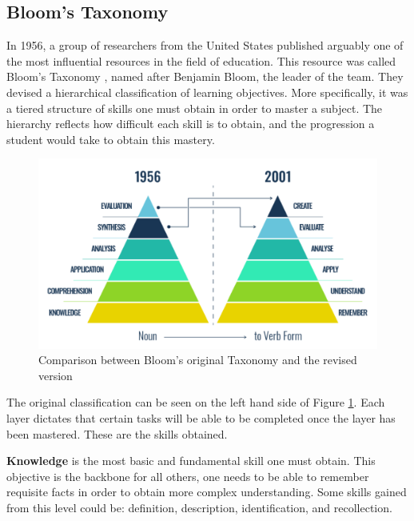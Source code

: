 \subsection{Bloom's Taxonomy}


In 1956, a group of researchers from the United States published arguably one of the most influential resources in the field of education. This resource was called Bloom's Taxonomy \cite{bloom-handbook-i}, named after Benjamin Bloom, the leader of the team. They devised a hierarchical classification of learning objectives. More specifically, it was a tiered structure of skills one must obtain in order to master a subject. The hierarchy reflects how difficult each skill is to obtain, and the progression a student would take to obtain this mastery.

\begin{figure}[h]
\centering
\includegraphics[scale=0.575]{blooms}
\caption{Comparison between Bloom's original Taxonomy and the revised version \cite{bloom-picture}} \label{fig:blooms}
\end{figure}

The original classification can be seen on the left hand side of Figure \ref{fig:blooms}. Each layer dictates that certain tasks will be able to be completed once the layer has been mastered. These are the skills obtained.

\textbf{Knowledge} is the most basic and fundamental skill one must obtain. This objective is the backbone for all others, one needs to be able to remember requisite facts in order to obtain more complex understanding. Some skills gained from this level could be: definition, description, identification, and recollection.

